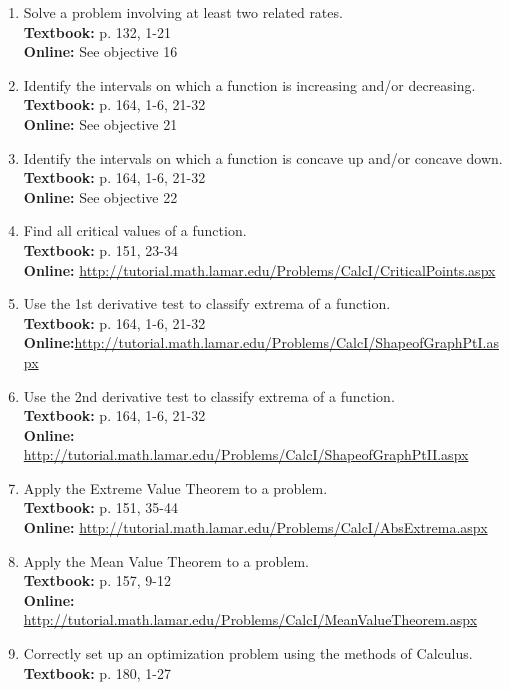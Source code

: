 \documentclass[12pt,landscape]{article}
\begin{document}
\begin{multicols}{2}
\begin{enumerate}
\item Solve a problem involving at least two related rates.\\
\textbf{Textbook:} p. 132, 1-21\\
\textbf{Online:} See objective 16
\item Identify the intervals on which a function is increasing and/or decreasing.\\
\textbf{Textbook:} p. 164, 1-6, 21-32\\
\textbf{Online:} See objective 21
\vspace{1in}
\item Identify the intervals on which a function is concave up and/or concave down.\\
\textbf{Textbook:} p. 164, 1-6, 21-32\\
\textbf{Online:} See objective 22
\item Find all critical values of a function.\\
\textbf{Textbook:} p. 151, 23-34 \\
\textbf{Online:} \url{http://tutorial.math.lamar.edu/Problems/CalcI/CriticalPoints.aspx}
\item Use the 1st derivative test to classify extrema of a function. \\
\textbf{Textbook:} p. 164, 1-6, 21-32 \\
\textbf{Online:}\url{http://tutorial.math.lamar.edu/Problems/CalcI/ShapeofGraphPtI.aspx}
\item Use the 2nd derivative test to classify extrema of a function.\\
\textbf{Textbook:} p. 164, 1-6, 21-32\\
\textbf{Online:} \url{http://tutorial.math.lamar.edu/Problems/CalcI/ShapeofGraphPtII.aspx}
\item Apply the Extreme Value Theorem to a problem.\\
\textbf{Textbook:} p. 151, 35-44\\
\textbf{Online:} \url{http://tutorial.math.lamar.edu/Problems/CalcI/AbsExtrema.aspx}
\item Apply the Mean Value Theorem to a problem.\\
\textbf{Textbook:} p. 157, 9-12\\
\textbf{Online:} \url{http://tutorial.math.lamar.edu/Problems/CalcI/MeanValueTheorem.aspx}
\item Correctly set up an optimization problem using the methods of Calculus.\\
\textbf{Textbook:} p. 180, 1-27\\

\end{enumerate}
\end{multicols}
\end{document}
